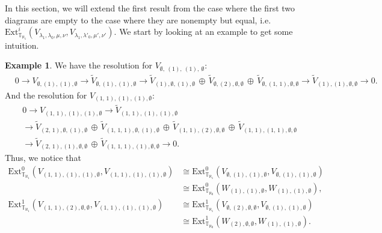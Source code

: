 \documentclass[openany, a4paper]{amsbook}
\theoremstyle{definition}
\newtheorem{exmp}[thm]{Example}
\numberwithin{equation}{chapter}
\newcommand{\T}[1]{{\mathbb{T}}_{\aleph_{#1}}}
\newcommand{\Ext}[4]{\mathrm{Ext}^{#1}_{#2}({#3}, {#4})}
\begin{document}
In this section, we will extend the first result from the case where the first two diagrams are empty to the case where they are nonempty but equal, i.e. $\Ext{i}{\T{1}}{V_{\lambda_1, \lambda_0, \mu, \nu}}{V_{\lambda_1, \lambda'_0, \mu', \nu'}}$. We start by looking at an example to get some intuition.

\begin{exmp}
    We have the resolution for $V_{ \emptyset, \ (1), \ (1), \ \emptyset }$:
    \begin{align*}
        & 0 \to 
        V_{ \emptyset, (1), (1), \emptyset }\to
        \tilde{V}_{ \emptyset, (1), (1), \emptyset } 
        \to
        \tilde{V}_{ (1), \emptyset, (1), \emptyset }\,\oplus\,\tilde{V}_{ \emptyset, (2), \emptyset, \emptyset }\,\oplus\,\tilde{V}_{ \emptyset, (1,\,1), \emptyset, \emptyset } 
        \to
        \tilde{V}_{ (1), (1), \emptyset, \emptyset }
        \to 0.
    \end{align*}
    And the resolution for $V_{ (1,\,1), (1), (1), \emptyset }$:
    \begin{align*}
        & 0 \to 
        V_{ (1,\,1), (1), (1), \emptyset }\to
        \tilde{V}_{ (1,\,1), (1), (1), \emptyset }
        \\ &
        \to
        \tilde{V}_{ (2,\,1), \emptyset, (1), \emptyset }\,\oplus\,\tilde{V}_{ (1,\,1,\,1), \emptyset, (1), \emptyset }\,\oplus\,\tilde{V}_{ (1,\,1), (2), \emptyset, \emptyset }\,\oplus\,\tilde{V}_{ (1,\,1), (1,\,1), \emptyset, \emptyset }
        \\ &
        \to
        \tilde{V}_{ (2,\,1), (1), \emptyset, \emptyset }\,\oplus\,\tilde{V}_{ (1,\,1,\,1), (1), \emptyset, \emptyset }
        \to 0.
    \end{align*}
    Thus, we notice that
    \begin{align*}
        \Ext{0}{\T{1}}{V_{ (1,\,1), (1), (1), \emptyset }}{V_{ (1,\,1), (1), (1), \emptyset }} &\cong \Ext{0}{\T{1}}{V_{ \emptyset, (1), (1), \emptyset }}{V_{ \emptyset, (1), (1), \emptyset }} \\ 
        &\cong \Ext{0}{\T{0}}{W_{ (1), (1), \emptyset }}{W_{ (1), (1), \emptyset }},  \\
        \Ext{1}{\T{1}}{V_{ (1,\,1), (2), \emptyset, \emptyset }}{V_{ (1,\,1), (1), (1), \emptyset }} &\cong \Ext{1}{\T{1}}{V_{ \emptyset, (2), \emptyset, \emptyset }}{V_{ \emptyset, (1), (1), \emptyset }} \\
        &\cong \Ext{1}{\T{0}}{W_{ (2), \emptyset, \emptyset }}{W_{(1), (1), \emptyset }}.
    \end{align*}
\end{exmp}
\end{document}
